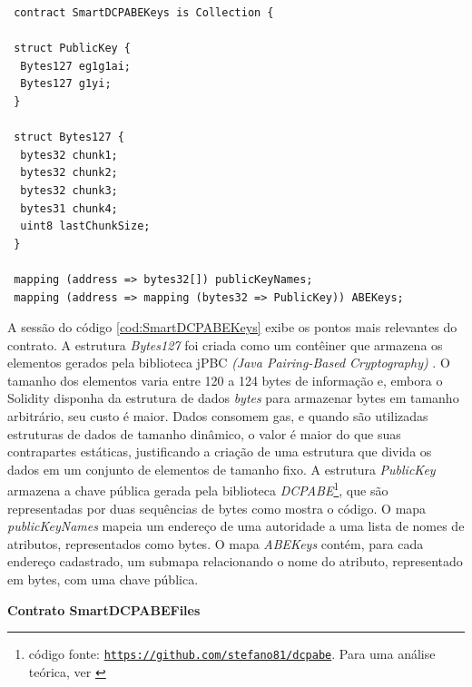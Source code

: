 \documentclass[a4paper,11pt]{article}
\begin{document}

\begin{lstlisting}
 contract SmartDCPABEKeys is Collection {

 struct PublicKey {
  Bytes127 eg1g1ai;
  Bytes127 g1yi;
 }

 struct Bytes127 {
  bytes32 chunk1;
  bytes32 chunk2;
  bytes32 chunk3;
  bytes31 chunk4;
  uint8 lastChunkSize;
 }

 mapping (address => bytes32[]) publicKeyNames;
 mapping (address => mapping (bytes32 => PublicKey)) ABEKeys;
\end{lstlisting}


A sessão do código \ref{cod:SmartDCPABEKeys} exibe os pontos mais relevantes do contrato.
A estrutura \emph{Bytes127} foi criada como um contêiner que armazena os elementos gerados pela biblioteca jPBC \emph{(Java Pairing-Based Cryptography)} \cite{DeCaro2011}. %
O tamanho dos elementos varia entre 120 a 124 bytes de informação e, embora o Solidity disponha da estrutura de dados \emph{bytes} para armazenar bytes em tamanho arbitrário, seu custo é maior.
Dados consomem gas, e quando são utilizadas estruturas de dados de tamanho dinâmico, o valor é maior do que suas contrapartes estáticas, justificando a criação de uma estrutura que divida os dados em um conjunto de elementos de tamanho fixo.
A estrutura \emph{PublicKey} armazena a chave pública gerada pela biblioteca \emph{DCPABE}\footnote{código fonte: \href{https://github.com/stefano81/dcpabe}{\texttt{https://github.com/stefano81/dcpabe}}. Para uma análise teórica, ver \cite{Lewko2011}}, que são representadas por duas sequências de bytes como mostra o código.
O mapa \emph{publicKeyNames} mapeia um endereço de uma autoridade a uma lista de nomes de atributos, representados como bytes.
O mapa \emph{ABEKeys} contém, para cada endereço cadastrado, um submapa relacionando o nome do atributo, representado em bytes, com uma chave pública.

\textbf{Contrato SmartDCPABEFiles}

\end{document}
